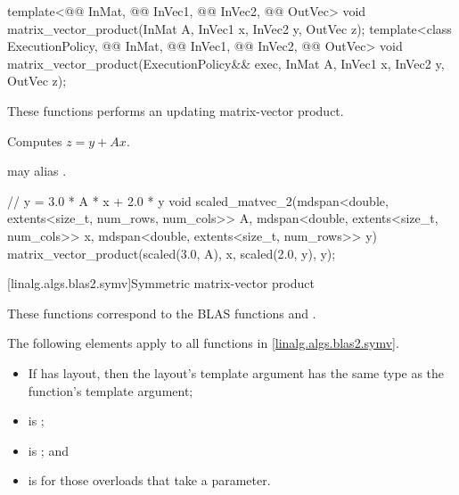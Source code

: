\begin{itemdecl}
  template<@@ InMat, @@ InVec1, @@ InVec2, @@ OutVec>
    void matrix_vector_product(InMat A, InVec1 x, InVec2 y, OutVec z);
  template<class ExecutionPolicy,
           @@ InMat, @@ InVec1, @@ InVec2, @@ OutVec>
    void matrix_vector_product(ExecutionPolicy&& exec,
                               InMat A, InVec1 x, InVec2 y, OutVec z);
\end{itemdecl}

\begin{itemdescr}
\pnum
These functions performs an updating matrix-vector product.

\pnum
\effects
Computes $z = y + A x$.

\pnum
\remarks
{} may alias .
\end{itemdescr}

\begin{example}
\begin{codeblock}
// y = 3.0 * A * x + 2.0 * y
void scaled_matvec_2(mdspan<double, extents<size_t, num_rows, num_cols>> A,
  mdspan<double, extents<size_t, num_cols>> x, mdspan<double, extents<size_t, num_rows>> y) {
  matrix_vector_product(scaled(3.0, A), x, scaled(2.0, y), y);
}
\end{codeblock}
\end{example}

[linalg.algs.blas2.symv]{Symmetric matrix-vector product}

\pnum
\begin{note}
These functions correspond to the BLAS functions
 and .
\end{note}

\pnum
The following elements apply to all functions in \ref{linalg.algs.blas2.symv}.

\pnum
\mandates
\begin{itemize}
\item
If  has  layout,
then the layout's  template argument has
the same type as the function's  template argument;
\item
{} is ;
\item
{}
is ; and
\item
{}
is  for those overloads that take a  parameter.
\end{itemize}

